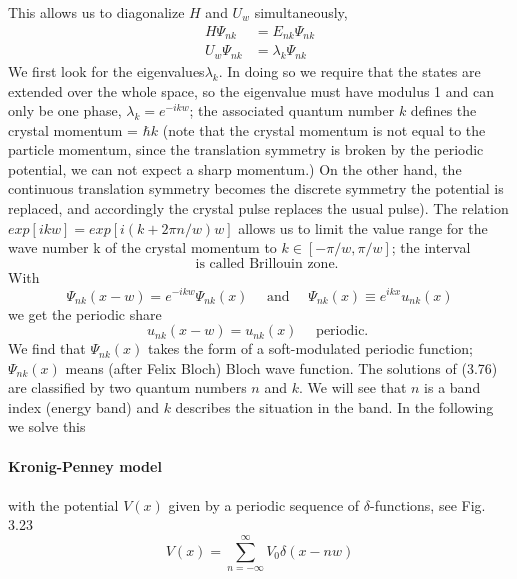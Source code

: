 This allows us to diagonalize $H$ and $U_w$ simultaneously,
\begin{equation}
\begin{aligned} H \Psi_{n k} &=E_{n k} \Psi_{n k} \\ U_{w} \Psi_{n k} &=\lambda_{k} \Psi_{n k} \end{aligned}
\end{equation}
We first look for the eigenvalues ​​$\lambda_k$. In doing so we require that the states are extended over the whole space, so the eigenvalue must have modulus 1 and can only be one phase, $\lambda_k = e^{-ikw}$; the associated quantum number $k$ defines the crystal momentum = $\hbar k$ (note that the crystal momentum is not equal to the particle momentum, since the translation symmetry is broken by the periodic potential, we can not expect a sharp momentum.) On the other hand, the continuous translation symmetry becomes the discrete symmetry the potential is replaced, and accordingly the crystal pulse replaces the usual pulse). The relation $exp [ikw] = exp [i (k + 2\pi n / w) w]$ allows us to limit the value range for the wave number k of the crystal momentum to $k \in [-\pi / w, \pi / w]$; the interval
\begin{equation}
    [-\pi / w, \pi / w] \quad \text { is called Brillouin zone. }
    \end{equation}
With
\begin{equation}
    \Psi_{n k}(x-w)=e^{-i k w} \Psi_{n k}(x) \quad \text { and } \quad \Psi_{n k}(x) \equiv e^{i k x} u_{n k}(x)
    \end{equation}
we get the periodic share
\begin{equation}
    u_{n k}(x-w)=u_{n k}(x) \quad \text { periodic. }
    \end{equation}
We find that $\Psi_{nk} (x)$ takes the form of a soft-modulated periodic function; $\Psi_{nk} (x)$ means (after Felix Bloch) Bloch wave function. The solutions of (3.76) are classified by two quantum numbers $n$ and $k$. We will see that $n$ is a band index (energy band) and $k$ describes the situation in the band. In the following we solve this\\\\
\textbf{Kronig-Penney model}\\\\
with the potential $V (x)$ given by a periodic sequence of $\delta$-functions, see Fig. 3.23
\begin{equation}
    V(x)=\sum_{n=-\infty}^{\infty} V_{0} \delta(x-n w)
    \end{equation}
